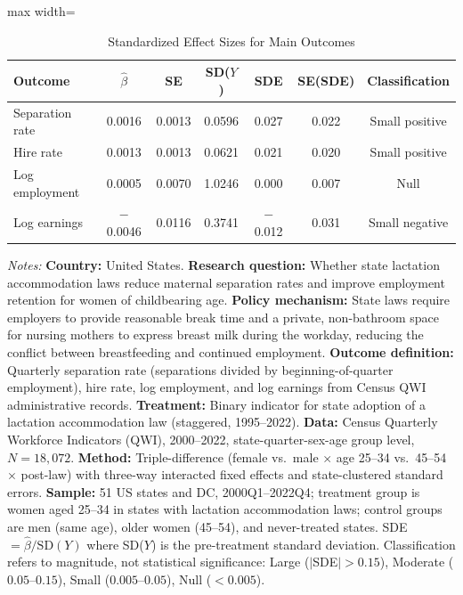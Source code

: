 \begin{table}[H]
\centering
\caption{Standardized Effect Sizes for Main Outcomes}
\label{tab:sde}
\begin{threeparttable}
\begin{adjustbox}{max width=\textwidth}
\begin{tabular}{lcccccc}
\toprule
Outcome & $\hat{\beta}$ & SE & SD($Y$) & SDE & SE(SDE) & Classification \\
\midrule
Separation rate & 0.0016 & 0.0013 & 0.0596 & 0.027 & 0.022 & Small positive \\
Hire rate & 0.0013 & 0.0013 & 0.0621 & 0.021 & 0.020 & Small positive \\
Log employment & 0.0005 & 0.0070 & 1.0246 & 0.000 & 0.007 & Null \\
Log earnings & $-$0.0046 & 0.0116 & 0.3741 & $-$0.012 & 0.031 & Small negative \\
\bottomrule
\end{tabular}
\end{adjustbox}
\begin{tablenotes}[flushleft]\small
\item \textit{Notes:}
\textbf{Country:} United States.
\textbf{Research question:} Whether state lactation accommodation laws reduce maternal separation rates and improve employment retention for women of childbearing age.
\textbf{Policy mechanism:} State laws require employers to provide reasonable break time and a private, non-bathroom space for nursing mothers to express breast milk during the workday, reducing the conflict between breastfeeding and continued employment.
\textbf{Outcome definition:} Quarterly separation rate (separations divided by beginning-of-quarter employment), hire rate, log employment, and log earnings from Census QWI administrative records.
\textbf{Treatment:} Binary indicator for state adoption of a lactation accommodation law (staggered, 1995--2022).
\textbf{Data:} Census Quarterly Workforce Indicators (QWI), 2000--2022, state-quarter-sex-age group level, $N = 18{,}072$.
\textbf{Method:} Triple-difference (female vs.\ male $\times$ age 25--34 vs.\ 45--54 $\times$ post-law) with three-way interacted fixed effects and state-clustered standard errors.
\textbf{Sample:} 51 US states and DC, 2000Q1--2022Q4; treatment group is women aged 25--34 in states with lactation accommodation laws; control groups are men (same age), older women (45--54), and never-treated states.
SDE $= \hat{\beta} / \text{SD}(Y)$ where SD($Y$) is the pre-treatment standard deviation. Classification refers to magnitude, not statistical significance: Large ($|$SDE$| > 0.15$), Moderate ($0.05$--$0.15$), Small ($0.005$--$0.05$), Null ($< 0.005$).
\end{tablenotes}
\end{threeparttable}
\end{table}
